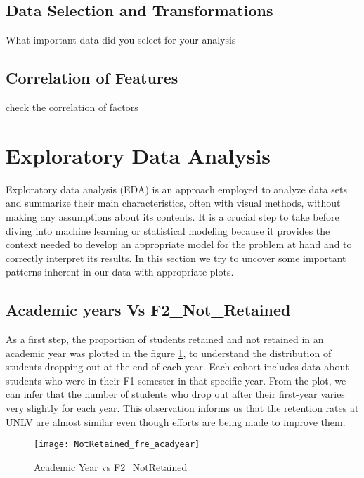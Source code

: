 \documentclass[11pt,openright]{report}
\begin{document}
\subsection {Data Selection and Transformations}
What important data did you select for your analysis
\subsection {Correlation of Features}
check the correlation of factors

\section{Exploratory Data Analysis}
Exploratory data analysis (EDA) is an approach employed to analyze data sets and summarize their main characteristics, often with visual methods, without making any assumptions about its contents. It is a crucial step to take before diving into machine learning or statistical modeling because it provides the context needed to develop an appropriate model for the problem at hand and to correctly interpret its results. In this section we try to uncover some important patterns inherent in our data with appropriate plots.

\subsection {Academic years Vs F2\_Not\_Retained}
As a first step, the proportion of students retained and not retained in an academic year was plotted in the figure \ref{fig:AcadYear_F2NotRetained_plot}, to understand the distribution of students dropping out at the end of each year. Each cohort includes data about students who were in their F1 semester in that specific year. From the plot, we can infer that the number of students who drop out after their first-year varies  very slightly for each year. This observation informs us that the retention rates at UNLV are almost similar even though efforts are being made to improve them.

\begin{figure}[!htbp]
	\centering
	\texttt{[image: NotRetained\_fre\_acadyear]}
	\caption{Academic Year vs F2\_NotRetained}
	\label{fig:AcadYear_F2NotRetained_plot}
\end{figure}
\end{document}
